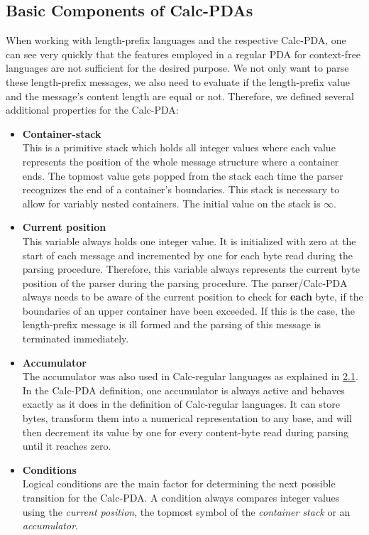\subsection{Basic Components of Calc-PDAs}
\label{4.2}
When working with length-prefix languages and the respective Calc-PDA, one can see very quickly that the features employed in a regular PDA for context-free languages are not sufficient for the desired purpose. We not only want to parse these length-prefix messages, we also need to evaluate if the length-prefix value and the message's content length are equal or not. Therefore, we defined several additional properties for the Calc-PDA:
\begin{itemize}
    \item \textbf{Container-stack}\\This is a primitive stack which holds all integer values where each value represents the position of the whole message structure where a container ends. The topmost value gets popped from the stack each time the parser recognizes the end of a container's boundaries. This stack is necessary to allow for variably nested containers. The initial value on the stack is $\infty$.
    \item \textbf{Current position}\\This variable always holds one integer value. It is initialized with zero at the start of each message and incremented by one for each byte read during the parsing procedure. Therefore, this variable always represents the current byte position of the parser during the parsing procedure. The parser/Calc-PDA always needs to be aware of the current position to check for \textbf{each} byte, if the boundaries of an upper container have been exceeded. If this is the case, the length-prefix message is ill formed and the parsing of this message is terminated immediately.
    \item \textbf{Accumulator}\\The accumulator was also used in Calc-regular languages as explained in \hyperref[2.1]{2.1}. In the Calc-PDA definition, one accumulator is always active and behaves exactly as it does in the definition of Calc-regular languages. It can store bytes, transform them into a numerical representation to any base, and will then decrement its value by one for every content-byte read during parsing until it reaches zero.
    \item \textbf{Conditions}\\Logical conditions are the main factor for determining the next possible transition for the Calc-PDA. A condition always compares integer values using the \textit{current position}, the topmost symbol of the \textit{container stack} or an \textit{accumulator}.

\end{itemize}
